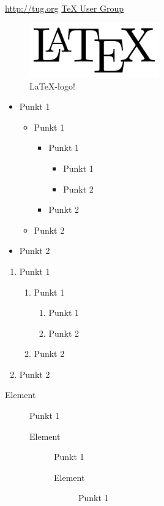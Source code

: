 \documentclass[a4paper, 12pt]{article}
\begin{document}
\newpage

\url{http://tug.org}
\href{http://tug.org}{\TeX{} User Group}

\begin{figure}[h!]
\centering
\includegraphics[width=0.5\textwidth]{latexlogo.png}
\caption{\LaTeX{}-logo!}
\label{fig:latexlogo}
\end{figure}


\begin{itemize}
\item
Punkt 1
\begin{itemize}
\item
Punkt 1
\begin{itemize}
\item
Punkt 1
\begin{itemize}
\item
Punkt 1
\item
Punkt 2
\end{itemize}
\item
Punkt 2
\end{itemize}
\item
Punkt 2
\end{itemize}
\item
Punkt 2
\end{itemize}


\begin{enumerate}
\item
Punkt 1
\begin{enumerate}
\item
Punkt 1
\begin{enumerate}
\item
Punkt 1
\item
Punkt 2
\end{enumerate}
\item
Punkt 2
\end{enumerate}
\item
Punkt 2
\end{enumerate}

\begin{description}
\item[Element] Punkt 1
\begin{description}
\item[Element] Punkt 1
\begin{description}
\item[Element] Punkt 1
\end{description}
\end{description}
\end{description}
\end{document}
